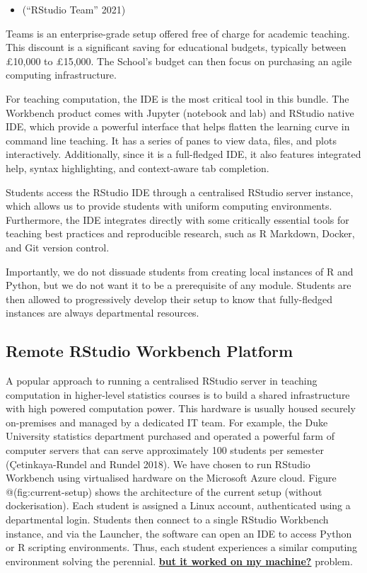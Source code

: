 \documentclass{article}
\providecommand{\tightlist}{%
  \setlength{\itemsep}{0pt}\setlength{\parskip}{0pt}}
\begin{document}
\begin{itemize}
\tightlist
\item
  ({``{RStudio} Team''} 2021)
\end{itemize}

Teams is an enterprise-grade setup offered free of charge for academic
teaching. This discount is a significant saving for educational budgets,
typically between £10,000 to £15,000. The School's budget can then focus
on purchasing an agile computing infrastructure.

For teaching computation, the IDE is the most critical tool in this
bundle. The Workbench product comes with Jupyter (notebook and lab) and
RStudio native IDE, which provide a powerful interface that helps
flatten the learning curve in command line teaching. It has a series of
panes to view data, files, and plots interactively. Additionally, since
it is a full-fledged IDE, it also features integrated help, syntax
highlighting, and context-aware tab completion.

Students access the RStudio IDE through a centralised RStudio server
instance, which allows us to provide students with uniform computing
environments. Furthermore, the IDE integrates directly with some
critically essential tools for teaching best practices and reproducible
research, such as R Markdown, Docker, and Git version control.

Importantly, we do not dissuade students from creating local instances
of R and Python, but we do not want it to be a prerequisite of any
module. Students are then allowed to progressively develop their setup
to know that fully-fledged instances are always departmental resources.

\hypertarget{remote-rstudio-workbench-platform}{%
\subsection{Remote RStudio Workbench
Platform}\label{remote-rstudio-workbench-platform}}

A popular approach to running a centralised RStudio server in teaching
computation in higher-level statistics courses is to build a shared
infrastructure with high powered computation power. This hardware is
usually housed securely on-premises and managed by a dedicated IT team.
For example, the Duke University statistics department purchased and
operated a powerful farm of computer servers that can serve
approximately 100 students per semester (Çetinkaya-Rundel and Rundel
2018). We have chosen to run RStudio Workbench using virtualised
hardware on the Microsoft Azure cloud. Figure @(fig:current-setup) shows
the architecture of the current setup (without dockerisation). Each
student is assigned a Linux account, authenticated using a departmental
login. Students then connect to a single RStudio Workbench instance, and
via the Launcher, the software can open an IDE to access Python or R
scripting environments. Thus, each student experiences a similar
computing environment solving the perennial.
\href{https://www.kevinwanke.com/why-you-should-never-use-the-phrase-but-it-works-on-my-machine/}{\textbf{but
it worked on my machine?}} problem.
\end{document}
